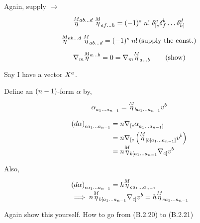 Again, supply $ \longrightarrow$

\begin{align*}
    & \tt{\ol{M}{\eta}}{ab \ldots d}{} \; \tt{\ol{M}{\eta}}{}{ef \ldots h} = (-1)^s \; n! \; \kron{a}{[e} \kron{b}{f} \ldots \kron{d}{h]} \\
\end{align*}

\begin{align*}
    & \tt{\ol{M}{\eta}}{ab \ldots d}{} \; \tt{\ol{M}{\eta}}{}{ab \ldots d} = (-1)^s \; n! \lera{ \text{supply the const.}} \\
\end{align*}

\begin{align*}
    & \nabla_m \tt{\ol{M}{\eta}}{a \ldots b}{} = 0 = \nabla_m \tt{\ol{M}{\eta}}{}{a \ldots b} \qquad \lera{ \text{show}} \\
\end{align*}

Say I have a vector $ \tt{X}{a}{}$.

Define an $ \left(  n-1 \right)$-form $ \alpha$ by,

\begin{align*}
    & \tt{\alpha}{}{a_1 \ldots a_{n-1}} = \tt{\ol{M}{\eta}}{}{b a_1 \ldots a_{n-1}} \tt{v}{b}{} \\
\end{align*}

\begin{align*}
    \tt{ \lera{ d \alpha}}{}{c a_1 \ldots a_{n-1}} &= n \nabla_{[c} \tt{\alpha}{}{a_1 \ldots a_{n-1}]} \\
    &= n \nabla_{[c} \lera{ \tt{\ol{M}{\eta}}{}{|b| a_1 \ldots a_{n-1}]} \tt{v}{b}{}} \\
    &= n \tt{\ol{M}{\eta}}{}{b [a_1 \ldots a_{n-1}} \nabla_{c]} \tt{v}{b}{} \\
\end{align*}

Also,

\begin{align*}
    & \tt{ \lera{ d \alpha}}{}{c a_1 \ldots a_{n-1}} = h \tt{\ol{M}{\eta}}{}{c a_1 \ldots a_{n-1}} \\
    & \implies n \tt{\ol{M}{\eta}}{}{b [a_1 \ldots a_{n-1}} \nabla_{c]} \tt{v}{b}{} = h \tt{\ol{M}{\eta}}{}{c a_1 \ldots a_{n-1}} \\
\end{align*}

Again show this yourself. How to go from (B.2.20) to (B.2.21)


